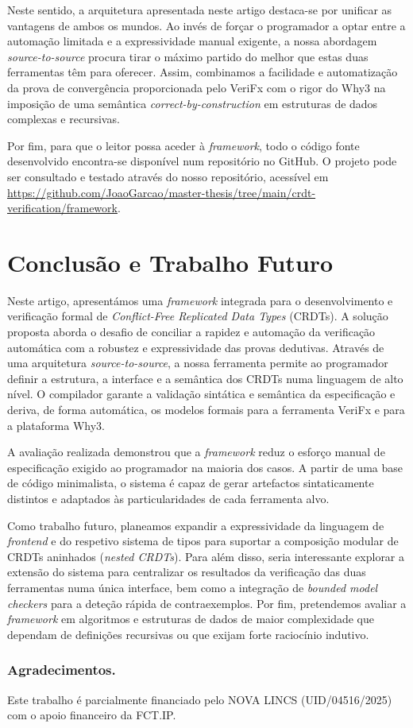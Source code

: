\documentclass{llncs}
\begin{document}
Neste sentido, a arquitetura apresentada neste artigo destaca-se por unificar as vantagens de ambos os mundos.
Ao invés de forçar o programador a optar entre a automação limitada e a expressividade manual exigente,
a nossa abordagem \textit{source-to-source} procura tirar o máximo partido do melhor que estas duas ferramentas têm para oferecer.
Assim, combinamos a facilidade e automatização da prova de convergência proporcionada pelo VeriFx com o
rigor do Why3 na imposição de uma semântica \textit{correct-by-construction} em estruturas de dados complexas e recursivas.

Por fim, para que o leitor possa aceder à \textit{framework}, todo o código fonte desenvolvido encontra-se
disponível num repositório no GitHub. O projeto pode ser consultado e testado através do nosso repositório,
acessível em \url{https://github.com/JoaoGarcao/master-thesis/tree/main/crdt-verification/framework}.

\section{Conclusão e Trabalho Futuro}

Neste artigo, apresentámos uma \textit{framework} integrada para o desenvolvimento e verificação formal de \textit{Conflict-Free Replicated Data Types} (CRDTs).
A solução proposta aborda o desafio de conciliar a rapidez e automação da verificação automática com a robustez e
expressividade das provas dedutivas. Através de uma arquitetura \textit{source-to-source},
a nossa ferramenta permite ao programador definir a estrutura, a interface e a semântica dos CRDTs numa linguagem de alto nível.
O compilador garante a validação sintática e semântica da especificação e deriva, de forma automática,
os modelos formais para a ferramenta VeriFx e para a plataforma Why3.

A avaliação realizada demonstrou que a \textit{framework} reduz o esforço manual de especificação exigido ao programador na maioria dos casos.
A partir de uma base de código minimalista, o sistema é capaz de gerar artefactos sintaticamente distintos e
adaptados às particularidades de cada ferramenta alvo.

Como trabalho futuro, planeamos expandir a expressividade da linguagem de \textit{frontend} e
do respetivo sistema de tipos para suportar a composição modular de CRDTs aninhados (\textit{nested CRDTs}).
Para além disso, seria interessante explorar a extensão do sistema para centralizar os resultados da verificação das duas ferramentas numa única interface,
bem como a integração de \textit{bounded model checkers} para a deteção rápida de contraexemplos.
Por fim, pretendemos avaliar a \textit{framework} em algoritmos e estruturas de dados de maior complexidade que dependam de
definições recursivas ou que exijam forte raciocínio indutivo.

\subsubsection*{Agradecimentos.}
\label{sec:agradecimentos}

Este trabalho é parcialmente financiado pelo NOVA LINCS (UID/04516/2025) com o apoio financeiro da FCT.IP.



\end{document}
